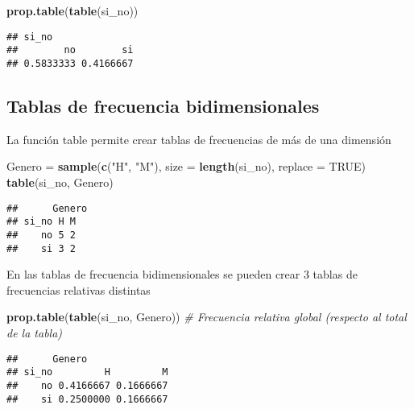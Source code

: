 \documentclass[]{article}
\newenvironment{Shaded}{\begin{snugshade}}{\end{snugshade}}
\newcommand{\CommentTok}[1]{\textcolor[rgb]{0.56,0.35,0.01}{\textit{#1}}}
\newcommand{\DataTypeTok}[1]{\textcolor[rgb]{0.13,0.29,0.53}{#1}}
\newcommand{\KeywordTok}[1]{\textcolor[rgb]{0.13,0.29,0.53}{\textbf{#1}}}
\newcommand{\NormalTok}[1]{#1}
\newcommand{\OtherTok}[1]{\textcolor[rgb]{0.56,0.35,0.01}{#1}}
\newcommand{\StringTok}[1]{\textcolor[rgb]{0.31,0.60,0.02}{#1}}
\begin{document}
\begin{Shaded}
\begin{Highlighting}[]
\KeywordTok{prop.table}\NormalTok{(}\KeywordTok{table}\NormalTok{(si_no))}
\end{Highlighting}
\end{Shaded}

\begin{verbatim}
## si_no
##        no        si 
## 0.5833333 0.4166667
\end{verbatim}

\hypertarget{tablas-de-frecuencia-bidimensionales}{%
\subsection{Tablas de frecuencia
bidimensionales}\label{tablas-de-frecuencia-bidimensionales}}

La función table permite crear tablas de frecuencias de más de una
dimensión

\begin{Shaded}
\begin{Highlighting}[]
\NormalTok{Genero =}\StringTok{ }\KeywordTok{sample}\NormalTok{(}\KeywordTok{c}\NormalTok{(}\StringTok{"H"}\NormalTok{, }\StringTok{"M"}\NormalTok{), }\DataTypeTok{size =} \KeywordTok{length}\NormalTok{(si_no), }\DataTypeTok{replace =} \OtherTok{TRUE}\NormalTok{)}
\KeywordTok{table}\NormalTok{(si_no, Genero)}
\end{Highlighting}
\end{Shaded}

\begin{verbatim}
##      Genero
## si_no H M
##    no 5 2
##    si 3 2
\end{verbatim}

En las tablas de frecuencia bidimensionales se pueden crear 3 tablas de
frecuencias relativas distintas

\begin{Shaded}
\begin{Highlighting}[]
\KeywordTok{prop.table}\NormalTok{(}\KeywordTok{table}\NormalTok{(si_no, Genero)) }\CommentTok{# Frecuencia relativa global (respecto al total de la tabla)}
\end{Highlighting}
\end{Shaded}

\begin{verbatim}
##      Genero
## si_no         H         M
##    no 0.4166667 0.1666667
##    si 0.2500000 0.1666667
\end{verbatim}
\end{document}
